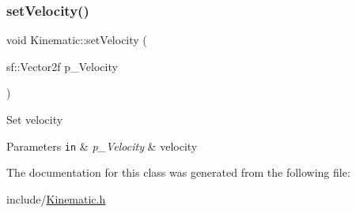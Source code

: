 \subsubsection{\texorpdfstring{set\+Velocity()}{setVelocity()}}
{\footnotesize\ttfamily void Kinematic\+::set\+Velocity (\begin{DoxyParamCaption}\item[{sf\+::\+Vector2f}]{p\+\_\+\+Velocity }\end{DoxyParamCaption})}

Set velocity 
\begin{DoxyParams}[1]{Parameters}
\mbox{\tt in}  & {\em p\+\_\+\+Velocity} & velocity \\
\hline
\end{DoxyParams}


The documentation for this class was generated from the following file\+:\begin{DoxyCompactItemize}
\item 
include/\hyperlink{_kinematic_8h}{Kinematic.\+h}\end{DoxyCompactItemize}
